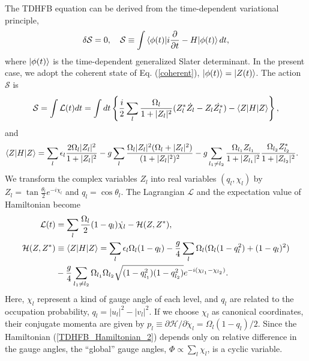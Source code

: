 \documentclass[%
superscriptaddress,
preprint,
showpacs,
nofootinbib,
amsmath,amssymb,
aps,
prc,
floatfix ]%
{revtex4-1}
\begin{document}
The TDHFB equation can be derived from the time-dependent variational
principle,
\begin{equation}
	\delta \mathcal{S} = 0,
	\quad
	\mathcal{S}\equiv
	\int \braket{\phi(t)|i\frac{\partial}{\partial t}-H|\phi(t)}dt,
  \label{TDHFB}
\end{equation}
where $\ket{\phi(t)}$ is the time-dependent generalized Slater determinant.
In the present case, we adopt the coherent state of Eq. (\ref{coherent}),
$\ket{\phi(t)}=\ket{Z(t)}$.
The action $\mathcal{S}$ is
\begin{equation}
	\mathcal{S}  = \int \mathcal{L}(t) dt
	= \int dt \left\{ \frac{i}{2} \sum_l \frac{\Omega_l}{1+|Z_l|^2}
  (Z_l^*\dot{Z_l}-Z_l\dot{Z_l^*}) - \braket{Z|H|Z} \right\} ,
\label{S}
\end{equation}
and
\begin{align}
  \braket{Z|H|Z} &= \sum_l \epsilon_l \frac{2\Omega_l |Z_l|^2}{1+|Z_l|^2}
  -g \sum_l \frac{\Omega_l|Z_l|^2(\Omega_l+|Z_l|^2)}{(1+|Z_l|^2)^2}
  -g \sum_{l_1 \neq l_2} \frac{\Omega_{l_1}Z_{l_1}}{1+|Z_{l_1}|^2}\frac{\Omega_{l_2}Z_{l_2}^*}{1+|Z_{l_2}|^2}.
	\label{TDHFB_Hamiltonian_1}
\end{align}
We transform the complex variables $Z_l$ into real variables $(q_l,\chi_l)$
by $Z_l = \tan{\frac{\theta_l}{2}}e^{-i\chi_l}$ and $q_l=\cos{\theta_l}$.
The Lagrangian $\mathcal{L}$ and the expectation value of Hamiltonian become
\begin{align}
\mathcal{L}(t) &= \sum_l \frac{\Omega_l}{2}
	(1-q_l)\dot{\chi_l} - \mathcal{H}(Z,Z^*) ,\\
	\mathcal{H}(Z,Z^*)&\equiv \braket{Z|H|Z} = \sum_l \epsilon_l\Omega_l(1- q_l) - \frac{g}{4}\sum_l \Omega_l (\Omega_l(1-q_l^2)+(1-q_l)^2) \nonumber \\
&- \frac{g}{4}\sum_{l_1\neq l_2} \Omega_{l_1}\Omega_{l_2}\sqrt{(1-q_{l_1}^2)(1-q_{l_2}^2)}e^{-i(\chi_{l_1}-\chi_{l_2})}   .
\label{TDHFB_Hamiltonian_2}
\end{align}
Here, $\chi_l$ represent a kind of gauge angle of each level,
and $q_l$ are related to the occupation probability, $q_l=|u_l|^2-|v_l|^2$.
If we choose $\chi_l$ as canonical coordinates, their conjugate momenta
are given by
$p_l\equiv \partial\mathcal{H}/\partial\dot{\chi}_l=\Omega_l(1-q_l)/2$.
Since the Hamiltonian (\ref{TDHFB_Hamiltonian_2}) depends only on
relative difference in the gauge angles,
the ``global'' gauge angles, $\Phi\propto\sum_l \chi_l$,
is a cyclic variable.
\end{document}
